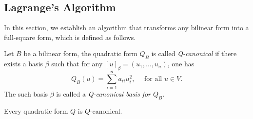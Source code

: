﻿\documentclass[12pt]{article}
\begin{document}
\subsection{Lagrange's Algorithm}
In this section, we establish an algorithm that transforms any bilinear form into a full-square form, which is defined as follows.
\begin{definition}
    Let $B$ be a bilinear form, the quadratic form $Q_B$ is called \textit{Q-canonical} if there exists a basis $\beta$ such that for any $[u]_{\beta} = (u_1,\dots, u_n)$, one has 
    \[
        Q_B(u) = \sum_{i = 1}^n a_{ii} u_i^2, \quad \text{ for all }u \in V.
    \]
    The such basis $\beta$ is called a \textit{Q-canonical basis for $Q_B$}.
\end{definition}
\begin{theorem}
    Every quadratic form $Q$ is $Q$-canonical.
\end{theorem}
\end{document}
